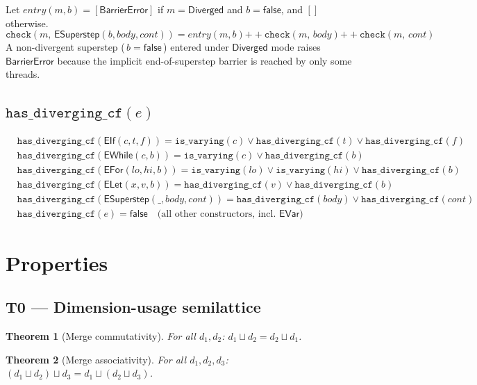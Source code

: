 \documentclass[11pt,a4paper]{article}
\theoremstyle{definition}
\theoremstyle{plain}
\newtheorem{theorem}{Theorem}[section]
\theoremstyle{remark}
\newcommand{\Diverged}{\mathsf{Diverged}}
\newcommand{\chk}[2]{\mathtt{check}(#1,\,#2)}
\newcommand{\isvarying}[1]{\mathtt{is\_varying}(#1)}
\newcommand{\cdcf}[1]{\mathtt{has\_diverging\_cf}(#1)}
\newcommand{\mergedim}{\mathbin{\sqcup}}
\begin{document}
Let $\mathit{entry}(m, b) = [\mathsf{BarrierError}]$ if $m = \Diverged$ and
$b = \mathsf{false}$, and $[]$ otherwise.
\[
  \chk{m}{\mathsf{ESuperstep}(b,\mathit{body},\mathit{cont})}
  = \mathit{entry}(m,b) \mathbin{++} \chk{m}{\mathit{body}} \mathbin{++} \chk{m}{\mathit{cont}}
\]
A non-divergent superstep (\,$b = \mathsf{false}$\,) entered under $\Diverged$
mode raises $\mathsf{BarrierError}$ because the implicit end-of-superstep barrier
is reached by only some threads.

\subsection{$\cdcf{e}$}

\begin{align*}
  &\cdcf{\mathsf{EIf}(c,t,f)} = \isvarying{c} \lor \cdcf{t} \lor \cdcf{f} \\
  &\cdcf{\mathsf{EWhile}(c,b)} = \isvarying{c} \lor \cdcf{b} \\
  &\cdcf{\mathsf{EFor}(lo,hi,b)} = \isvarying{lo} \lor \isvarying{hi} \lor \cdcf{b} \\
  &\cdcf{\mathsf{ELet}(x,v,b)} = \cdcf{v} \lor \cdcf{b} \\
  &\cdcf{\mathsf{ESuperstep}(\_,body,cont)} = \cdcf{body} \lor \cdcf{cont} \\
  &\cdcf{e} = \mathsf{false} \quad \text{(all other constructors, incl.\ $\mathsf{EVar}$)}
\end{align*}

\section{Properties}
\label{sec:properties}

\subsection{T0 --- Dimension-usage semilattice}
\label{sec:dimmerge}

\begin{theorem}[Merge commutativity]
  \label{thm:merge-comm}
  For all $d_1, d_2$: $d_1 \mergedim d_2 = d_2 \mergedim d_1$.
\end{theorem}

\begin{theorem}[Merge associativity]
  \label{thm:merge-assoc}
  For all $d_1, d_2, d_3$: $(d_1 \mergedim d_2) \mergedim d_3 = d_1 \mergedim (d_2 \mergedim d_3)$.
\end{theorem}
\end{document}
